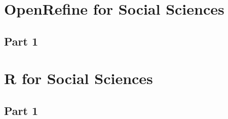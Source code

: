 \documentclass{article}
\begin{document}
\section{OpenRefine for Social Sciences}
\subsection{Part 1}


\section{R for Social Sciences}
\subsection{Part 1}
\end{document}
